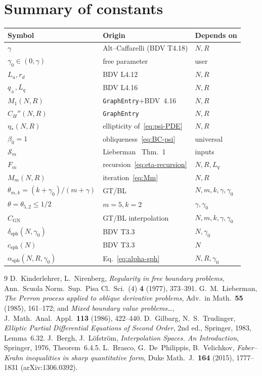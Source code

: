 \documentclass[11pt,a4paper]{article}
\theoremstyle{definition}
\theoremstyle{remark}
\newcommand{\sph}{\mathrm{sph}}
\begin{document}
\section{Summary of constants}\label{sec:summary}

\begin{center}
\renewcommand{\arraystretch}{1.20}
\begin{tabular}{@{}lll@{}}
\toprule
Symbol & Origin & Depends on \\
\midrule
$\gamma$ & Alt--Caffarelli (BDV T4.18) & $N,R$ \\
$\gamma_{0}\in(0,\gamma)$ & free parameter & user \\
$L_{u},r_{d}$ & BDV L4.12 & $N,R$ \\
$q_{\pm},L_{q}$ & BDV L4.16 & $N,R$ \\
$M_{1}(N,R)$ & \texttt{GraphEntry}+BDV~4.16 & $N,R$ \\
$C_{H}''(N,R)$ & \texttt{GraphEntry} & $N,R$ \\
$\eta_{*}(N,R)$ & ellipticity of~\eqref{eq:psi-PDE} & $N,R$ \\
$\beta_{0}=1$ & obliqueness~\eqref{eq:BC-psi} & universal \\
$\mathcal{S}_{m}$ & Lieberman~\cite{Li86} Thm.~1 & inputs \\
$F_{m}$ & recursion~\eqref{eq:eta-recursion} & $N,R,L_{q}$ \\
$M_{m}(N,R)$ & iteration~\eqref{eq:Mm} & $N,R$ \\
$\theta_{m,k}=(k+\gamma_{0})/(m+\gamma)$ & GT/BL & $N,m,k,\gamma,\gamma_{0}$ \\
$\theta=\theta_{5,2}\le1/2$ & $m=5,k=2$ & $\gamma,\gamma_{0}$ \\
$C_{\mathrm{GN}}$ & GT/BL interpolation & $N,m,k,\gamma,\gamma_{0}$ \\
$\delta_{\sph}(N,\gamma_{0})$ & BDV T3.3 & $N,\gamma_{0}$ \\
$c_{\sph}(N)$ & BDV T3.3 & $N$ \\
\midrule
$\boxed{\alpha_{\sph}(N,R,\gamma_{0})}$
   & Eq.~\eqref{eq:alpha-sph}
   & $N,R,\gamma_{0}$ \\
\bottomrule
\end{tabular}
\end{center}

\begin{thebibliography}{9}
 D.~Kinderlehrer, L.~Nirenberg,
\emph{Regularity in free boundary problems},
Ann.~Scuola Norm.~Sup.~Pisa Cl.~Sci.\ (4) \textbf{4} (1977), 373--391.
 G.~M.~Lieberman,
\emph{The Perron process applied to oblique derivative problems},
Adv.\ in Math.\ \textbf{55} (1985), 161--172; and
\emph{Mixed boundary value problems\ldots},
J.~Math.\ Anal.\ Appl.\ \textbf{113} (1986), 422--440.
 D.~Gilbarg, N.~S.~Trudinger,
\emph{Elliptic Partial Differential Equations of Second Order},
2nd ed., Springer, 1983, Lemma~6.32.
 J.~Bergh, J.~L\"ofstr\"om,
\emph{Interpolation Spaces. An Introduction},
Springer, 1976, Theorem~6.4.5.
 L.~Brasco, G.~De~Philippis, B.~Velichkov,
\emph{Faber--Krahn inequalities in sharp quantitative form},
Duke Math.\ J.\ \textbf{164} (2015), 1777--1831 (arXiv:1306.0392).
\end{thebibliography}
\end{document}
